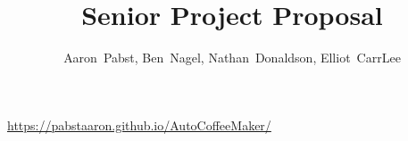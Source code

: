 \documentclass[conference]{IEEEtran}
\begin{document}
\title{Senior Project Proposal}


\author{Aaron~Pabst, Ben~Nagel, Nathan~Donaldson, Elliot~CarrLee}
\url{https://pabstaaron.github.io/AutoCoffeeMaker/}


% 


\maketitle
\end{document}
